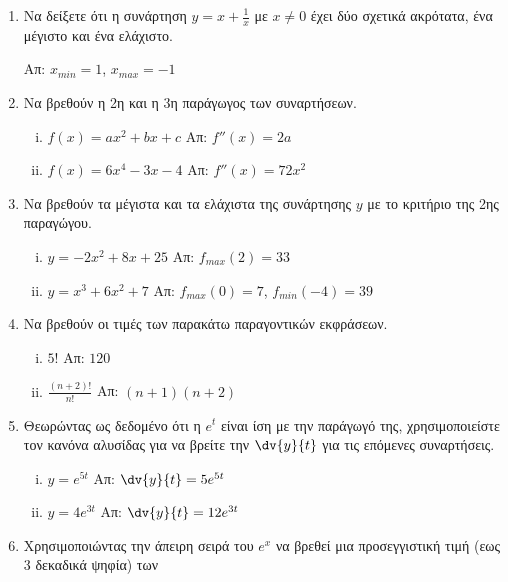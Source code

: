\begin{enumerate}
  \item Να δείξετε ότι η συνάρτηση $ y = x + \frac{1}{x} $ με $ x \neq 0 $ έχει δύο σχετικά
    ακρότατα, ένα μέγιστο και ένα ελάχιστο. 

    \hfill Απ: $ x_{min} = 1$, $ x_{max}=-1  $ 

  \item Να βρεθούν η 2η και η 3η παράγωγος των συναρτήσεων.

    \begin{enumerate}[i)]
      \item $ f(x) = ax^{2}+bx+c $ \hfill Απ: $ f''(x)=2a $
      \item $ f(x) = 6x^{4}-3x-4 $ \hfill Απ: $ f''(x) = 72x^{2} $ 
    \end{enumerate}

  \item Να βρεθούν τα μέγιστα και τα ελάχιστα της συνάρτησης $ y $ με το κριτήριο της 2ης
    παραγώγου.

    \begin{enumerate}[i)]
      \item $ y = -2x^{2}+8x+25 $ \hfill Απ: $ f_{max}(2)=33 $
      \item $ y = x^{3}+6x^{2}+7 $ \hfill Απ: $ f_{max}(0)=7 $, $ f_{min}(-4)=39 $ 
    \end{enumerate}

  \item Να βρεθούν οι τιμές των παρακάτω παραγοντικών εκφράσεων.

    \begin{enumerate}[i)]
      \item $ 5! $ \hfill Απ: $ 120 $
      \item $ \frac{(n+2)!}{n!} $ \hfill Απ: $ (n+1)(n+2) $
    \end{enumerate}

  \item Θεωρώντας ως δεδομένο ότι η $ e^{t} $ είναι ίση με την παράγωγό της, χρησιμοποιείστε τον
    κανόνα αλυσίδας για να βρείτε την $ \dv{y}{t} $ για τις επόμενες συναρτήσεις.

    \begin{enumerate}[i)]
      \item $ y = e^{5t} $ \hfill Απ: $ \dv{y}{t} = 5e^{5t} $
      \item $ y = 4e^{3t} $ \hfill Απ: $ \dv{y}{t} = 12e^{3t} $ 
    \end{enumerate}

  \item Χρησιμοποιώντας την άπειρη σειρά του $ e^{x} $ να βρεθεί μια προσεγγιστική τιμή (εως 3
    δεκαδικά ψηφία) των 


\end{enumerate}
